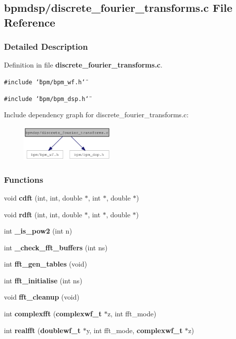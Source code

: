 \subsection{bpmdsp/discrete\_\-fourier\_\-transforms.c File Reference}
\label{discrete__fourier__transforms_8c}


\subsubsection{Detailed Description}


Definition in file {\bf discrete\_\-fourier\_\-transforms.c}.

{\tt \#include \char`\"{}bpm/bpm\_\-wf.h\char`\"{}}\par
{\tt \#include \char`\"{}bpm/bpm\_\-dsp.h\char`\"{}}\par


Include dependency graph for discrete\_\-fourier\_\-transforms.c:\nopagebreak
\begin{figure}[H]
\begin{center}
\leavevmode
\includegraphics[width=131pt]{discrete__fourier__transforms_8c__incl}
\end{center}
\end{figure}
\subsubsection*{Functions}
\begin{CompactItemize}
\item 
void \textbf{cdft} (int, int, double $\ast$, int $\ast$, double $\ast$)\label{discrete__fourier__transforms_8c_dd439be0f19853cd7568299e4e9f2043}

\item 
void \textbf{rdft} (int, int, double $\ast$, int $\ast$, double $\ast$)\label{discrete__fourier__transforms_8c_39caf6956db3e0243c1a29009d4bf68c}

\item 
int \textbf{\_\-is\_\-pow2} (int n)\label{discrete__fourier__transforms_8c_ae95d6a6ef87ec161047540b4e675fdd}

\item 
int \textbf{\_\-check\_\-fft\_\-buffers} (int ns)\label{discrete__fourier__transforms_8c_fa13ee764b0fe25cf3c4b99e5205bb5d}

\item 
int {\bf fft\_\-gen\_\-tables} (void)
\item 
int {\bf fft\_\-initialise} (int ns)
\item 
void {\bf fft\_\-cleanup} (void)
\item 
int {\bf complexfft} ({\bf complexwf\_\-t} $\ast$z, int fft\_\-mode)
\item 
int {\bf realfft} ({\bf doublewf\_\-t} $\ast$y, int fft\_\-mode, {\bf complexwf\_\-t} $\ast$z)
\end{CompactItemize}
